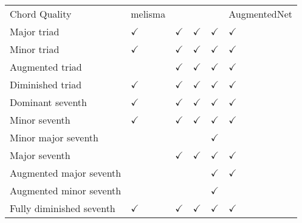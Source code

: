 \begin{tabular}{llllll}
Chord Quality             & \gls{melisma} & \textcite{chen2021attend} & \textcite{micchi2021deep} & \textcite{mcleod2021modular} & \gls{AugmentedNet} \\
Major triad               & $\checkmark$      & $\checkmark$                        & $\checkmark$                        & $\checkmark$                           & $\checkmark$                 \\
Minor triad               & $\checkmark$      & $\checkmark$                        & $\checkmark$                        & $\checkmark$                           & $\checkmark$                 \\
Augmented triad           &         & $\checkmark$                        & $\checkmark$                        & $\checkmark$                           & $\checkmark$                 \\
Diminished triad          & $\checkmark$      & $\checkmark$                        & $\checkmark$                        & $\checkmark$                           & $\checkmark$                 \\
Dominant seventh          & $\checkmark$      & $\checkmark$                        & $\checkmark$                        & $\checkmark$                           & $\checkmark$                 \\
Minor seventh             & $\checkmark$      & $\checkmark$                        & $\checkmark$                        & $\checkmark$                           & $\checkmark$                 \\
Minor major seventh       &         &                           &                           & $\checkmark$                           &                    \\
Major seventh             &         & $\checkmark$                        & $\checkmark$                        & $\checkmark$                           & $\checkmark$                 \\
Augmented major seventh   &         &                           &                           & $\checkmark$                           & $\checkmark$                 \\
Augmented minor seventh   &         &                           &                           & $\checkmark$                           &                    \\
Fully diminished seventh  & $\checkmark$      & $\checkmark$                        & $\checkmark$                        & $\checkmark$                           & $\checkmark$                 \\

\end{tabular}
